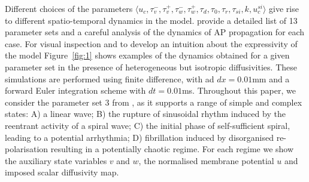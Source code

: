 \documentclass[utf8]{frontiersSCNS} %
\begin{document}
Different choices of the parameters $\langle u_c, \tau_v^-, \tau_v^+, \tau_w^-, \tau_w^+, \tau_d, \tau_0, \tau_r,\allowbreak \tau_{si}, k, u_c^{si} \rangle$ give rise to different spatio-temporal dynamics in the model.
\cite{Fenton2002} provide a detailed list of 13 parameter sets and a careful analysis of the dynamics of AP propagation for each case. 
For visual inspection and to develop an intuition about the expressivity of the model Figure~\ref{fig:1} shows examples of the dynamics obtained for a given parameter set in the presence of heterogeneous but isotropic diffusivities.
These simulations are performed using finite difference, with ad $dx = 0.01$mm and a forward Euler integration scheme with $dt = 0.01$ms. 
Throughout this paper, we consider the parameter set 3 from \cite{Fenton2002}, as it supports a range of simple and complex states: A) a linear wave; B) the rupture of sinusoidal rhythm induced by the reentrant activity of a spiral wave; C) the initial phase of self-sufficient spiral, leading to a potential arrhythmia; D) fibrillation induced by disorganised re-polarisation resulting in a potentially chaotic regime.
For each regime we show the auxiliary state variables $v$ and $w$, the normalised membrane potential $u$ and imposed scalar diffusivity map. 
\end{document}
